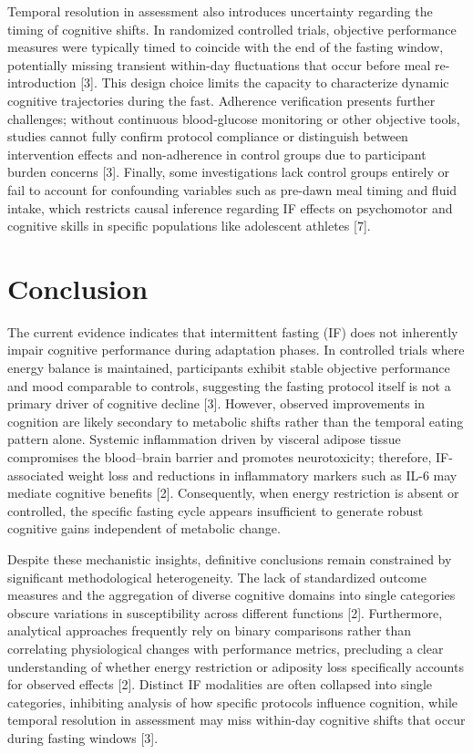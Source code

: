\documentclass[conference]{IEEEtran}
\begin{document}
Temporal resolution in assessment also introduces uncertainty regarding the timing of cognitive shifts. In randomized controlled trials, objective performance measures were typically timed to coincide with the end of the fasting window, potentially missing transient within-day fluctuations that occur before meal re-introduction [3]. This design choice limits the capacity to characterize dynamic cognitive trajectories during the fast. Adherence verification presents further challenges; without continuous blood-glucose monitoring or other objective tools, studies cannot fully confirm protocol compliance or distinguish between intervention effects and non-adherence in control groups due to participant burden concerns [3]. Finally, some investigations lack control groups entirely or fail to account for confounding variables such as pre-dawn meal timing and fluid intake, which restricts causal inference regarding IF effects on psychomotor and cognitive skills in specific populations like adolescent athletes [7].

\section{Conclusion}
The current evidence indicates that intermittent fasting (IF) does not inherently impair cognitive performance during adaptation phases. In controlled trials where energy balance is maintained, participants exhibit stable objective performance and mood comparable to controls, suggesting the fasting protocol itself is not a primary driver of cognitive decline [3]. However, observed improvements in cognition are likely secondary to metabolic shifts rather than the temporal eating pattern alone. Systemic inflammation driven by visceral adipose tissue compromises the blood–brain barrier and promotes neurotoxicity; therefore, IF-associated weight loss and reductions in inflammatory markers such as IL-6 may mediate cognitive benefits [2]. Consequently, when energy restriction is absent or controlled, the specific fasting cycle appears insufficient to generate robust cognitive gains independent of metabolic change.

Despite these mechanistic insights, definitive conclusions remain constrained by significant methodological heterogeneity. The lack of standardized outcome measures and the aggregation of diverse cognitive domains into single categories obscure variations in susceptibility across different functions [2]. Furthermore, analytical approaches frequently rely on binary comparisons rather than correlating physiological changes with performance metrics, precluding a clear understanding of whether energy restriction or adiposity loss specifically accounts for observed effects [2]. Distinct IF modalities are often collapsed into single categories, inhibiting analysis of how specific protocols influence cognition, while temporal resolution in assessment may miss within-day cognitive shifts that occur during fasting windows [3].
\end{document}
